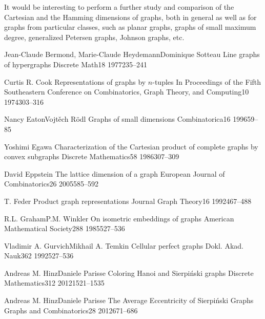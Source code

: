 \documentclass[12pt,a4paper,titlepage,openany]{report}
\begin{document}
It would be interesting to perform a further study and comparison of the Cartesian and the Hamming dimensions of graphs, both in general as well as for graphs from particular classes, such as planar graphs, graphs of small maximum degree, generalized Petersen graphs, Johnson graphs, etc.

 \begin{thebibliography}{99}
\thispagestyle{fancy}

  \articleInJournalManyAuthors
    {Jean-Claude Bermond, Marie-Claude Heydemann}{Dominique Sotteau}
    {Line graphs of hypergraphs}
   {Discrete Math}{18}
   {1977}{235--241}


  \articleInJournalOneAuthor
    {Curtis R. Cook}
    {Representations of graphs by $n$-tuples}
   {In Proceedings of the Fifth Southeastern Conference on Combinatorics, Graph Theory, and Computing}{10}
   {1974}{303--316}


  \articleInJournalManyAuthors
    {Nancy Eaton}{Vojt\v ech R\" odl}
    {Graphs of small dimensions}
   {Combinatorica}{16}
   {1996}{59--85}

  \articleInJournalOneAuthor
    {Yoshimi Egawa}
    {Characterization of the Cartesian product of complete graphs by convex subgraphs}
   {Discrete Mathematics}{58}
   {1986}{307--309}

\articleInJournalOneAuthor
    {David Eppstein}
    {The lattice dimension of a graph}
   {European Journal of Combinatorics}{26}
   {2005}{585--592}

\articleInJournalOneAuthor
    {T. Feder}
    {Product graph representations}
   {Journal Graph Theory}{16}
   {1992}{467--488}

  \articleInJournalManyAuthors
    {R.L. Graham}{P.M. Winkler}
    {On isometric embeddings of graphs}
   {American Mathematical Society}{288}
   {1985}{527--536}

  \articleInJournalManyAuthors
    {Vladimir A. Gurvich}{Mikhail A. Temkin}
    {Cellular perfect graphs}
   {Dokl. Akad. Nauk}{362}
   {1992}{527--536}

  \articleInJournalManyAuthors
    {Andreas M. Hinz}{Daniele Parisse}
    {Coloring Hanoi and Sierpiński graphs}
   {Discrete Mathematics}{312}
   {2012}{1521--1535}

  \articleInJournalManyAuthors
    {Andreas M. Hinz}{Daniele Parisse}
    {The Average Eccentricity of Sierpi\' nski Graphs}
   {Graphs and Combinatorics}{28}
   {2012}{671--686}


\end{thebibliography}
\end{document}
